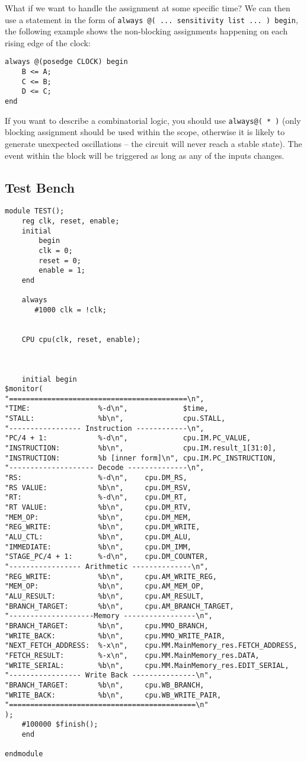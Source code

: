 What if we want to handle the assignment at some specific time? We can then use a statement in the form of \texttt{always @( ...  sensitivity  list  ... ) begin}, the following example shows the non-blocking assignments happening on each rising edge of the clock:
\begin{verbatim}
always @(posedge CLOCK) begin
    B <= A;
    C <= B;
    D <= C;
end
\end{verbatim}
If you want to describe a combinatorial logic, you should use \texttt{always@( * )} (only blocking assignment should be used within the scope, otherwise it is likely to generate unexpected oscillations -- the circuit will never reach a stable state). The event within the block will be triggered as long as any of the inputs changes.
\subsection{Test Bench}
\begin{verbatim}
module TEST();
    reg clk, reset, enable;
    initial 
        begin
        clk = 0;
        reset = 0;
        enable = 1;
    end

    always
       #1000 clk = !clk;


    CPU cpu(clk, reset, enable);



    initial begin
$monitor(
"==========================================\n",
"TIME:                %-d\n",             $time, 
"STALL:               %b\n",              cpu.STALL,
"----------------- Instruction ------------\n",
"PC/4 + 1:            %-d\n",             cpu.IM.PC_VALUE,
"INSTRUCTION:         %b\n",              cpu.IM.result_1[31:0],
"INSTRUCTION:         %b [inner form]\n", cpu.IM.PC_INSTRUCTION,
"-------------------- Decode --------------\n",
"RS:                  %-d\n",    cpu.DM_RS,
"RS VALUE:            %b\n",     cpu.DM_RSV,
"RT:                  %-d\n",    cpu.DM_RT,
"RT VALUE:            %b\n",     cpu.DM_RTV,
"MEM_OP:              %b\n",     cpu.DM_MEM,
"REG_WRITE:           %b\n",     cpu.DM_WRITE,
"ALU_CTL:             %b\n",     cpu.DM_ALU,
"IMMEDIATE:           %b\n",     cpu.DM_IMM,
"STAGE_PC/4 + 1:      %-d\n",    cpu.DM_COUNTER,
"----------------- Arithmetic --------------\n",
"REG_WRITE:           %b\n",     cpu.AM_WRITE_REG,
"MEM_OP:              %b\n",     cpu.AM_MEM_OP,
"ALU_RESULT:          %b\n",     cpu.AM_RESULT,
"BRANCH_TARGET:       %b\n",     cpu.AM_BRANCH_TARGET,
"--------------------Memory -----------------\n",
"BRANCH_TARGET:       %b\n",     cpu.MMO_BRANCH,
"WRITE_BACK:          %b\n",     cpu.MMO_WRITE_PAIR,
"NEXT_FETCH_ADDRESS:  %-x\n",    cpu.MM.MainMemory_res.FETCH_ADDRESS,
"FETCH_RESULT:        %-x\n",    cpu.MM.MainMemory_res.DATA,
"WRITE_SERIAL:        %b\n",     cpu.MM.MainMemory_res.EDIT_SERIAL,
"----------------- Write Back ---------------\n",
"BRANCH_TARGET:       %b\n",     cpu.WB_BRANCH,
"WRITE_BACK:          %b\n",     cpu.WB_WRITE_PAIR,
"============================================\n"
);
    #100000 $finish();
    end

endmodule
\end{verbatim}
